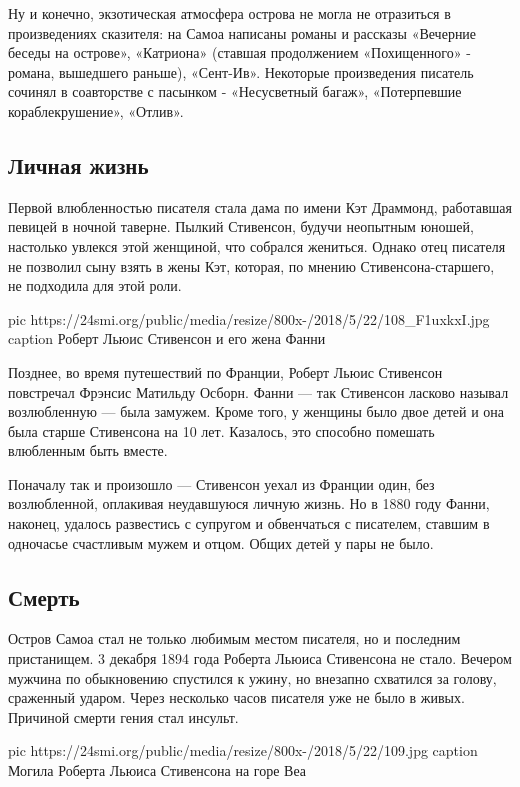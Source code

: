 Ну и конечно, экзотическая атмосфера острова не могла не отразиться в
произведениях сказителя: на Самоа написаны романы и рассказы «Вечерние
беседы на острове», «Катриона» (ставшая продолжением «Похищенного» -
романа, вышедшего раньше), «Сент-Ив». Некоторые произведения писатель
сочинял в соавторстве с пасынком - «Несусветный багаж», «Потерпевшие
кораблекрушение», «Отлив».

\subsection{Личная жизнь}

Первой влюбленностью писателя стала дама по имени Кэт Драммонд, работавшая
певицей в ночной таверне. Пылкий Стивенсон, будучи неопытным юношей,
настолько увлекся этой женщиной, что собрался жениться. Однако отец
писателя не позволил сыну взять в жены Кэт, которая, по мнению
Стивенсона-старшего, не подходила для этой роли.

\ifcmt
pic https://24smi.org/public/media/resize/800x-/2018/5/22/108_F1uxkxI.jpg
caption Роберт Льюис Стивенсон и его жена Фанни
\fi

Позднее, во время путешествий по Франции, Роберт Льюис Стивенсон
повстречал Фрэнсис Матильду Осборн. Фанни --- так Стивенсон ласково называл
возлюбленную --- была замужем. Кроме того, у женщины было двое детей и она
была старше Стивенсона на 10 лет. Казалось, это способно помешать
влюбленным быть вместе.

Поначалу так и произошло --- Стивенсон уехал из Франции один, без
возлюбленной, оплакивая неудавшуюся личную жизнь. Но в 1880 году Фанни,
наконец, удалось развестись с супругом и обвенчаться с писателем, ставшим
в одночасье счастливым мужем и отцом. Общих детей у пары не было.

\subsection{Смерть}

Остров Самоа стал не только любимым местом писателя, но и последним
пристанищем. 3 декабря 1894 года Роберта Льюиса Стивенсона не стало.
Вечером мужчина по обыкновению спустился к ужину, но внезапно схватился за
голову, сраженный ударом. Через несколько часов писателя уже не было в
живых. Причиной смерти гения стал инсульт.

\ifcmt
pic https://24smi.org/public/media/resize/800x-/2018/5/22/109.jpg
caption Могила Роберта Льюиса Стивенсона на горе Веа
\fi


